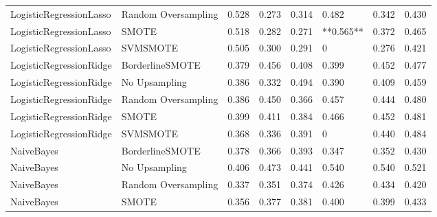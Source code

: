 \begin{tabular}{llllllll}
     LogisticRegressionLasso & Random Oversampling & 0.528 &                     0.273 &                 0.314 &                  0.482 &                                   0.342 &    0.430 \\
     LogisticRegressionLasso &               SMOTE & 0.518 &                     0.282 &                 0.271 &              **0.565** &                                   0.372 &    0.465 \\
     LogisticRegressionLasso &            SVMSMOTE & 0.505 &                     0.300 &                 0.291 &                      0 &                                   0.276 &    0.421 \\
     LogisticRegressionRidge &     BorderlineSMOTE & 0.379 &                     0.456 &                 0.408 &                  0.399 &                                   0.452 &    0.477 \\
     LogisticRegressionRidge &       No Upsampling & 0.386 &                     0.332 &                 0.494 &                  0.390 &                                   0.409 &    0.459 \\
     LogisticRegressionRidge & Random Oversampling & 0.386 &                     0.450 &                 0.366 &                  0.457 &                                   0.444 &    0.480 \\
     LogisticRegressionRidge &               SMOTE & 0.399 &                     0.411 &                 0.384 &                  0.466 &                                   0.452 &    0.481 \\
     LogisticRegressionRidge &            SVMSMOTE & 0.368 &                     0.336 &                 0.391 &                      0 &                                   0.440 &    0.484 \\
                  NaiveBayes &     BorderlineSMOTE & 0.378 &                     0.366 &                 0.393 &                  0.347 &                                   0.352 &    0.430 \\
                  NaiveBayes &       No Upsampling & 0.406 &                     0.473 &                 0.441 &                  0.540 &                                   0.540 &    0.521 \\
                  NaiveBayes & Random Oversampling & 0.337 &                     0.351 &                 0.374 &                  0.426 &                                   0.434 &    0.420 \\
                  NaiveBayes &               SMOTE & 0.356 &                     0.377 &                 0.381 &                  0.400 &                                   0.399 &    0.433 \\

\end{tabular}
